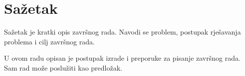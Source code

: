 \section*{Sažetak}
\label{sec:summary}
Sažetak je kratki opis završnog rada. Navodi se problem, postupak rješavanja problema i cilj završnog rada.

U ovom radu opisan je postupak izrade i preporuke za pisanje završnog rada. Sam rad može poslužiti kao predložak.
